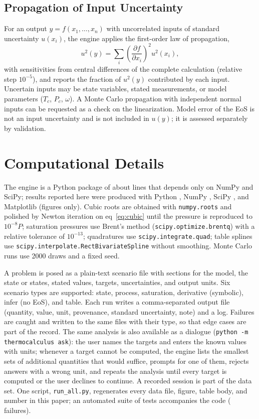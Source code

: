\documentclass[journal=iecred,manuscript=article,layout=twocolumn]{achemso}
\begin{document}
\subsection{Propagation of Input Uncertainty}

For an output $y = f(x_1,\dots,x_n)$ with uncorrelated inputs of standard
uncertainty $u(x_i)$, the engine applies the first-order law of
propagation,\cite{GUM2008}
\begin{equation}
u^2(y) = \sum_{i}\left(\frac{\partial f}{\partial x_i}\right)^{\!2}u^2(x_i),
\label{eq:gum}
\end{equation}
with sensitivities from central differences of the complete calculation
(relative step $10^{-5}$), and reports the fraction of $u^2(y)$ contributed by
each input. Uncertain inputs may be state variables, stated measurements, or
model parameters ($T_c$, $P_c$, $\omega$). A Monte Carlo propagation with
independent normal inputs can be requested as a check on the linearization.
Model error of the EoS is not an input uncertainty and is not included in
$u(y)$; it is assessed separately by validation.

\section{Computational Details}

The engine is a Python package of about \NCodeLines{} lines that depends only
on NumPy and SciPy; results reported here were produced with Python \PyVer{},
NumPy \NumpyVer{}, SciPy \ScipyVer{}, and Matplotlib \MplVer{} (figures only).
Cubic roots are obtained with \texttt{numpy.roots} and polished by Newton
iteration on eq~\ref{eq:cubic} until the pressure is reproduced to
$10^{-8}P$; saturation pressures use Brent's method
(\texttt{scipy.optimize.brentq}) with a relative tolerance of $10^{-13}$;
quadratures use \texttt{scipy.integrate.quad}; table splines use
\texttt{scipy.interpolate.RectBivariateSpline} without smoothing. Monte Carlo
runs use 2000 draws and a fixed seed.

A problem is posed as a plain-text scenario file with sections for the model,
the state or states, stated values, targets, uncertainties, and output units.
Six scenario types are supported: state, process, saturation, derivative
(symbolic), infer (no EoS), and table. Each run writes a comma-separated output
file (quantity, value, unit, provenance, standard uncertainty, note) and a log.
Failures are caught and written to the same files with their type, so that edge
cases are part of the record. The same analysis is also available as a
dialogue (\texttt{python -m thermocalculus ask}): the user names the targets and
enters the known values with units; whenever a target cannot be computed, the
engine lists the smallest sets of additional quantities that would suffice,
prompts for one of them, rejects answers with a wrong unit, and repeats the
analysis until every target is computed or the user declines to continue. A
recorded session is part of the data set. One script, \texttt{run\_all.py}, regenerates
every data file, figure, table body, and number in this paper; an automated
suite of \NTests{} tests accompanies the code (\NTestsFailed{} failures).
\end{document}
